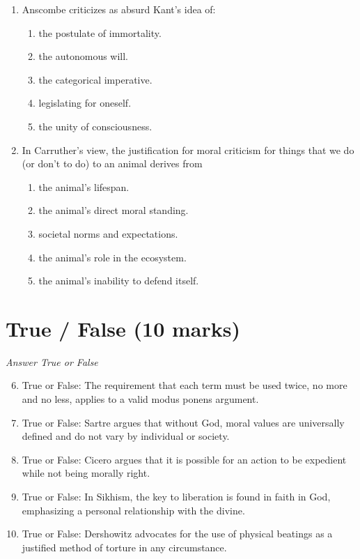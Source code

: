 \documentclass[12pt]{article}
\begin{document}
\begin{enumerate}[label=\arabic*.]
\begin{enumerate}[label=(\alph*)]
\end{enumerate}
\item Anscombe criticizes as absurd Kant's idea of:
\begin{enumerate}[label=(\alph*)]
    \item the postulate of immortality.
    \item the autonomous will.
    \item the categorical imperative.
    \item legislating for oneself.
    \item the unity of consciousness.
\end{enumerate}
\item In Carruther's view, the justification for moral criticism for things that we do (or don't to do) to an animal derives from
\begin{enumerate}[label=(\alph*)]
    \item the animal's lifespan.
    \item the animal's direct moral standing.
    \item societal norms and expectations.
    \item the animal's role in the ecosystem.
    \item the animal's inability to defend itself.
\end{enumerate}
\end{enumerate}

\section*{True / False (10 marks)}
\textit{Answer True or False}
\begin{enumerate}[label=\arabic*.]
\setcounter{enumi}{5}
\item True or False: The requirement that each term must be used twice, no more and no less, applies to a valid modus ponens argument.
\item True or False: Sartre argues that without God, moral values are universally defined and do not vary by individual or society.
\item True or False: Cicero argues that it is possible for an action to be expedient while not being morally right.
\item True or False: In Sikhism, the key to liberation is found in faith in God, emphasizing a personal relationship with the divine.
\item True or False: Dershowitz advocates for the use of physical beatings as a justified method of torture in any circumstance.
\end{enumerate}
\end{document}
